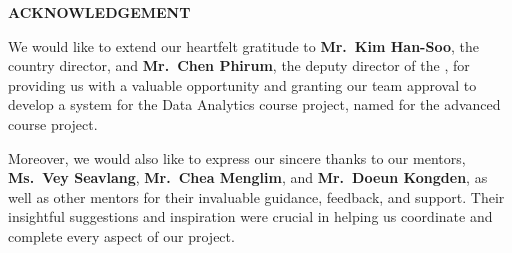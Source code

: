 {\raggedright \noindent \textbf{\Large ACKNOWLEDGEMENT}\par}
\vspace{0.3cm}

\noindent We would like to extend our heartfelt gratitude to \textbf{Mr.~Kim
Han-Soo}, the country director, and \textbf{Mr.~Chen Phirum}, the deputy
director of the \institution, for providing us with a valuable
opportunity and granting our team approval to develop a system for the
Data Analytics course project, named \projname{} for the advanced course
project.

\vspace{0.3cm}

\noindent Moreover, we would also like to express our sincere thanks to our
mentors, \textbf{Ms.~Vey Seavlang}, \textbf{Mr.~Chea Menglim}, and
\textbf{Mr.~Doeun Kongden}, as well as other mentors for their
invaluable guidance, feedback, and support. Their insightful suggestions
and inspiration were crucial in helping us coordinate and complete every
aspect of our project.

\vspace{0.8cm}
